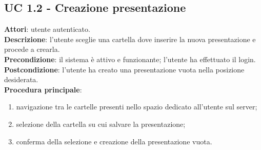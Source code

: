 \subsection{UC 1.2 - Creazione presentazione}{
	\label{uc1.2}
	\textbf{Attori}: utente autenticato.	\\
	\textbf{Descrizione}: l'utente sceglie una cartella dove inserire la nuova presentazione e procede a crearla.	\\
	\textbf{Precondizione}: il sistema è attivo e funzionante; l'utente ha effettuato il login.	\\
	\textbf{Postcondizione}: l'utente ha creato una presentazione vuota nella posizione desiderata.	\\
	\textbf{Procedura principale}:
	\begin{enumerate}
		\item navigazione tra le cartelle presenti nello spazio dedicato all'utente sul server;
		\item selezione della cartella su cui salvare la presentazione;
		\item conferma della selezione e creazione della presentazione vuota.
	\end{enumerate}
	}